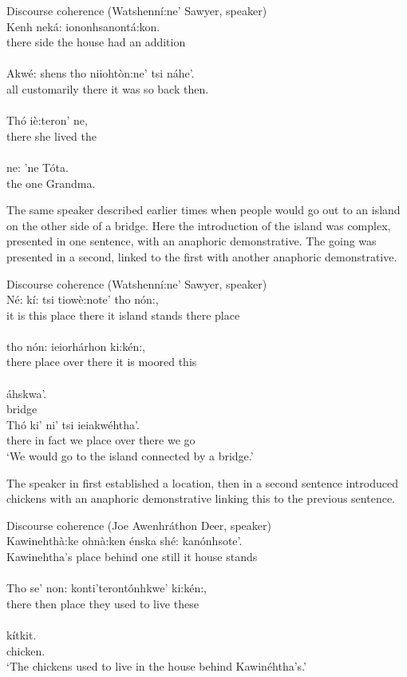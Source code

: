 \documentclass[output=paper,colorlinks,citecolor=brown]{langscibook}
\begin{document}
\ea Discourse coherence (Watshenní:ne' Sawyer, speaker)\\\label{ex:mithun:15}
\gll 
Kenh neká: iononhsanontá:kon.\\
there side {the house had an addition}\\
\medskip\\
\gll Akwé: shens      tho    niiohtòn:ne' tsi náhe'.\\
     all customarily  there {it was so}  {back then}.\\
\medskip\\
\gll Thó iè:teron'       ne,\\
     there  {she lived}  the\\
\medskip\\
\gll ne: 'ne Tóta.\\
    the one Grandma.\\
\z

The same speaker described earlier times when people would go out to an island on the other side of a bridge. Here the introduction of the island was complex, presented in one sentence, with an anaphoric demonstrative. The going was presented in a second, linked to the first with another anaphoric demonstrative.

\ea Discourse coherence (Watshenní:ne' Sawyer, speaker)\\\label{ex:mithun:16}
\gll Né: kí: tsi tiowè:note' tho nón:,\\                      
     {it is} this place {there it island stands} there place\\
\medskip\\
\gll tho nón: ieiorhárhon ki:kén:,\\    
     there place {over there it is moored} this\\    
\medskip\\
áhskwa'.\\      
bridge\medskip\\
\gll Thó  ki' ni' tsi  ieiakwéhtha'.\\
     there {in fact}  we place {over there we go}\\
\glt `We would go to the island connected by a bridge.'
\z


The speaker in  first established a location, then in a second sentence introduced chickens with an anaphoric demonstrative linking this to the previous sentence.

\ea Discourse coherence (Joe Awenhráthon Deer, speaker)\\\label{ex:mithun:17}
\gll Kawinehthà:ke ohnà:ken énska shé: kanónhsote'.\\ 
     {Kawinehtha's place} behind  one  still {it house stands}\\ 
\medskip\\
\gll Tho se' non: konti'terontónhkwe' ki:kén:,\\
there  then  place {they used to live} these  \\
\medskip\\
\gll  kítkit.\\
chicken.\\
\glt `The chickens used to live in the house behind Kawinéhtha's.'
\z
\end{document}
